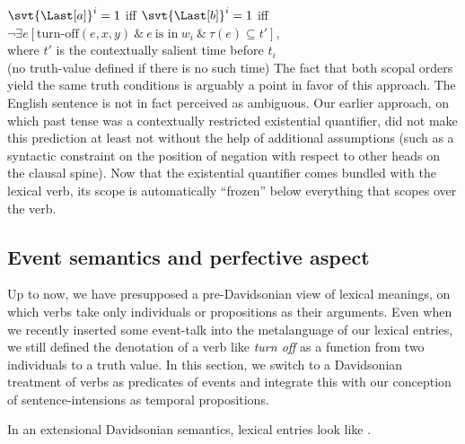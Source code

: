 \ex $\svt{\Last[a]}^{i} = 1$ iff $\svt{\Last[b]}^{i} = 1$ iff\\
\hfill$\neg \exists e [\text{turn-off}(e,x,y)\ \&\ e\ \text{is
  in}\ w_{i}\ \&\ \tau(e) \subseteq t']$,\\ \hfill where $t'$ is the
contextually salient time before $t_{i}$\\ \hfill (no truth-value defined if
there is no such time) \xe
%
The fact that both scopal orders yield the same truth conditions is arguably a
point in favor of this approach. The English sentence is not in fact perceived
as ambiguous. Our earlier approach, on which past tense was a contextually
restricted existential quantifier, did not make this prediction \dash at least
not without the help of additional assumptions (such as a syntactic constraint
on the position of negation with respect to other heads on the clausal spine).
Now that the existential quantifier comes bundled with the lexical verb, its
scope is automatically ``frozen'' below everything that scopes over the verb.

\subsection{Event semantics and perfective aspect}
\label{sec:event-perfective}

%
Up to now, we have presupposed a pre-Davidsonian view of lexical meanings, on
which verbs take only individuals or propositions as their arguments. Even when
we recently inserted some event-talk into the metalanguage of our lexical
entries, we still defined the denotation of a verb like \emph{turn off} as a
function from two individuals to a truth value. In this section, we switch to a
Davidsonian treatment of verbs as predicates of events and integrate this with
our conception of sentence-intensions as temporal propositions.

%
In an extensional Davidsonian semantics, lexical entries look like \Next.

